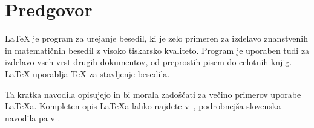 

\chapter{Predgovor}

\LaTeX{} \cite{manual} je program za urejanje besedil, ki je zelo primeren za 
izdelavo znanstvenih in matematičnih besedil z visoko tiskarsko kvaliteto.
Program je uporaben tudi za izdelavo vseh vrst drugih dokumentov, od 
preprostih pisem do celotnih knjig.
\LaTeX{} uporablja \TeX{} \cite{texbook} za stavljenje besedila.

Ta kratka navodila opisujejo \LaTeXe{} in bi morala zadoščati za večino
primerov uporabe \LaTeX{}a. Kompleten opis \LaTeX{}a lahko najdete v~\cite{manual,companion}, podrobnejša 
slovenska navodila pa v \cite{Batagelj}.

